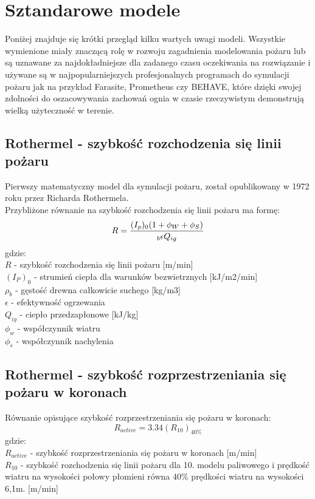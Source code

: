 \documentclass[a4paper, 11pt]{article}
\begin{document}
	\section* {Sztandarowe modele}
	\indent
	
	Poniżej znajduje się krótki przegląd kilku wartych uwagi modeli. Wszystkie wymienione miały znaczącą rolę w rozwoju zagadnienia modelowania pożaru lub są uznawane za najdokładniejsze dla zadanego czasu oczekiwania na rozwiązanie i używane są w najpopularniejszych profesjonalnych programach do symulacji pożaru jak na przykład Farasite, Prometheus czy BEHAVE, które dzięki swojej zdolności do oszacowywania zachowań ognia w czasie rzeczywistym demonstrują wielką użyteczność w terenie.
	\subsection{Rothermel - szybkość rozchodzenia się linii pożaru}
	\indent

	Pierwszy matematyczny model dla symulacji pożaru, został opublikowany w 1972 roku przez Richarda Rothermela.\\
	
	Przybliżone równanie na szybkość rozchodzenia się linii pożaru ma formę:
$$
R=\frac{(I_p)_0(1+\phi_W +\phi_S)}{_b\epsilon Q_{ig}}\\
$$
gdzie:\\
$R$	- szybkość rozchodzenia się linii pożaru	[m/min]\\
$(I_P)_0$	- 	strumień ciepła dla warunków bezwietrznych	[kJ/m2/min]\\
$\rho_b$	- 	gęstość drewna całkowicie suchego	[kg/m3]\\
$\epsilon$ 	- efektywność ogrzewania	\\
$Q_{ig}$	- 	ciepło przedzapłonowe	[kJ/kg]\\
$\phi_w$	- 	współczynnik wiatru	\\
$\phi_s$	- 	współczynnik nachylenia\\


\subsection{Rothermel - szybkość rozprzestrzeniania się pożaru w koronach}
\indent

Równanie opisujące szybkość rozprzestrzeniania się pożaru w koronach:
$$
R_{active}=3.34(R_10)_{40\%}
$$
gdzie: \\
$R_{active}$ - szybkość rozprzestrzeniania się pożaru w koronach [m/min]\\
$R_10$ - szybkość rozchodzenia się linii pożaru dla 10. modelu paliwowego i prędkość wiatru na wysokości połowy płomieni równa 40\% prędkości wiatru na wysokości 6,1m. [m/min]\\
\end{document}
